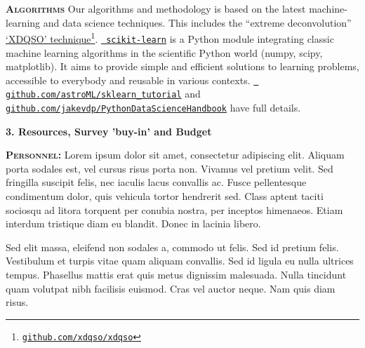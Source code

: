 \documentclass[oneside, a4paper, onecolumn, 11pt]{article}
\begin{document}
\smallskip
\smallskip
\noindent
\textbf{\textsc{Algorithms}}
Our algorithms and methodology is based on the latest machine-learning and data science techniques. 
This includes the ``extreme deconvolution'' \href{http://www.sdss.org/dr14/data\_access/value-added-catalogs/?vac\_id=xdqso/}{`XDQSO' technique}\footnote{\href{https://github.com/xdqso/xdqso}{\tt github.com/xdqso/xdqso}}.
\href{http://ogrisel.github.io/scikit-learn.org/sklearn-tutorial/index.html}{\tt
scikit-learn} is a Python module integrating classic machine learning
algorithms in the scientific Python world (numpy, scipy,
matplotlib). It aims to provide simple and efficient solutions to
learning problems, accessible to everybody and reusable in various
contexts.  \href{https://github.com/astroML/sklearn\_tutorial}{{\tt
github.com/astroML/sklearn\_tutorial}} and \href{https://github.com/jakevdp/PythonDataScienceHandbook}{{\tt github.com/jakevdp/PythonDataScienceHandbook}} have full details.



\smallskip
\smallskip
\noindent
\large
{\bf{\textcolor{Cerulean}{3. Resources,  Survey 'buy-in' and Budget}}}
\normalsize

\smallskip
\smallskip
\noindent
\textbf{\textsc{Personnel:}} 
 Lorem ipsum dolor sit amet, consectetur adipiscing elit. Aliquam porta sodales est, vel cursus risus porta non. Vivamus vel pretium velit. Sed fringilla suscipit felis, nec iaculis lacus convallis ac. Fusce pellentesque condimentum dolor, quis vehicula tortor hendrerit sed. Class aptent taciti sociosqu ad litora torquent per conubia nostra, per inceptos himenaeos. Etiam interdum tristique diam eu blandit. Donec in lacinia libero.

\noindent
Sed elit massa, eleifend non sodales a, commodo ut felis. Sed id pretium felis. Vestibulum et turpis vitae quam aliquam convallis. Sed id ligula eu nulla ultrices tempus. Phasellus mattis erat quis metus dignissim malesuada. Nulla tincidunt quam volutpat nibh facilisis euismod. Cras vel auctor neque. Nam quis diam risus.
\end{document}
